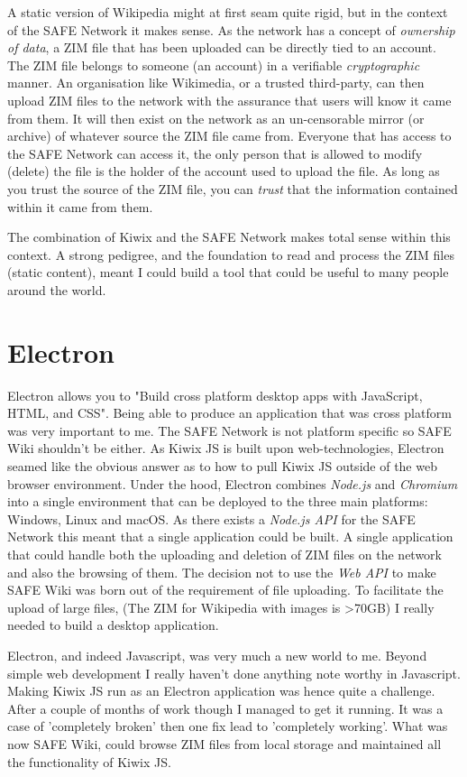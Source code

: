 A static version of Wikipedia might at first seam quite rigid, but in the context of the SAFE Network it makes sense. As the network has a concept of \textit{ownership of data}, a ZIM file that has been uploaded can be directly tied to an account. The ZIM file belongs to someone (an account) in a verifiable \textit{cryptographic} manner. An organisation like Wikimedia, or a trusted third-party, can then upload ZIM files to the network with the assurance that users will know it came from them. It will then exist on the network as an un-censorable mirror (or archive) of whatever source the ZIM file came from. Everyone that has access to the SAFE Network can access it, the only person that is allowed to modify (delete) the file is the holder of the account used to upload the file. As long as you trust the source of the ZIM file, you can \textit{trust} that the information contained within it came from them.

The combination of Kiwix and the SAFE Network makes total sense within this context. A strong pedigree, and the foundation to read and process the ZIM files (static content), meant I could build a tool that could be useful to many people around the world.

\section{Electron}

Electron allows you to "Build cross platform desktop apps with JavaScript, HTML, and CSS". Being able to produce an application that was cross platform was very important to me. The SAFE Network is not platform specific so SAFE Wiki shouldn't be either. As Kiwix JS is built upon web-technologies, Electron seamed like the obvious answer as to how to pull Kiwix JS outside of the web browser environment. Under the hood, Electron combines \textit{Node.js} and \textit{Chromium} into a single environment that can be deployed to the three main platforms: Windows, Linux and macOS. As there exists a \textit{Node.js API} for the SAFE Network this meant that a single application could be built. A single application that could handle both the uploading and deletion of ZIM files on the network and also the browsing of them. The decision not to use the \textit{Web API} to make SAFE Wiki was born out of the requirement of file uploading. To facilitate the upload of large files, (The ZIM for Wikipedia with images is \textgreater 70GB) I really needed to build a desktop application. 

Electron, and indeed Javascript, was very much a new world to me. Beyond simple web development I really haven't done anything note worthy in Javascript. Making Kiwix JS run as an Electron application was hence quite a challenge. After a couple of months of work though I managed to get it running. It was a case of 'completely broken' then one fix lead to 'completely working'. What was now SAFE Wiki, could browse ZIM files from local storage and maintained all the functionality of Kiwix JS.
